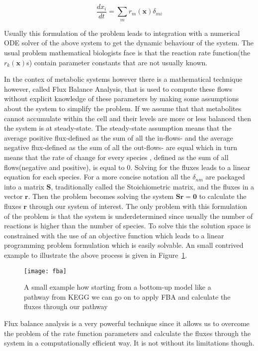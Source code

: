 \begin{equation*}
\frac{dx_i}{dt} = \sum_{m} r_m(\mathbf{x})\delta_{mi}
\end{equation*}

Usually this formulation of the problem leads to integration with a
numerical ODE solver of the above system to get the dynamic behaviour
of the system. The usual problem mathematical biologists face is that
the reaction rate function(the $r_k(\mathbf{x})$s) contain parameter
constants that are not usually known. 

In the contex of metabolic systems however there is a mathematical technique however, called Flux Balance
Analysis, that is used to compute these flows without explicit
knowledge of these parameters by making some assumptions about the
system to simplify the problem. If we assume that that metabolites
cannot accumulate within the cell and their levels are more or less
balanced then the system is at steady-state. The steady-state assumption means that the average positive flux-defined as the sum of
all the in-flows- and the average negative flux-defined as the sum of
all the out-flows- are equal which in turn means that the rate of
change for every species , defined as the sum of all flows(negative and
positive), is equal to 0. Solving for the fluxes leads to a linear equation for each
species. For a more concise notation all the $\delta_{nm}$ are
packaged into a matrix $\mathbf{S}$, traditionally called the Stoichiometric
matrix, and the fluxes in a vector $\mathbf{r}$. Then the problem
becomes solving the system $\mathbf{Sr} = \mathbf{0}$ to calculate the
fluxes $\mathbf{r}$ through our system of interest. The only problem
with this formulation of the problem is that the system is
underdetermined since usually the number of reactions is higher than
the number of species. To solve this the solution space is constrained
with the use of an objective function which leads to a linear
programming problem formulation which is easily solvable. An small
contrived example to illustrate the above process is given in
Figure~\ref{fig:fba}.

\begin{figure}[htbp!] 
\centering    
\texttt{[image: fba]}
\caption[Flux Balance analysis]{A small example how starting from a
  bottom-up model like a pathway from KEGG we can go on to apply FBA
  and calculate the fluxes through our pathway}
\label{fig:fba}
\end{figure}

Flux balance analysis is a very powerful technique since it allows us
to overcome the problem of the rate function parameters and calculate the
fluxes through the system in a computationally efficient way. It is
not without its limitations though.

